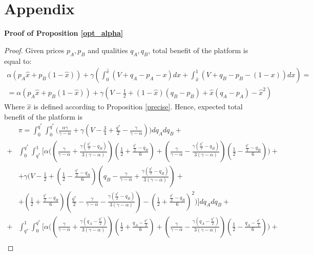 \documentclass[a4paper]{article}
\begin{document}
\section*{Appendix}
	\textbf{Proof of Proposition \ref{opt_alpha}}
	\begin{proof} Given prices $p_A, p_B$ and qualities $q_A, q_B$, total benefit of the platform is equal to:
		\begin{align*}
		\alpha(p_A \hat{x} + p_B(1-\hat{x})) + \gamma \left(\int_{0}^{\hat{x}} (V + q_A - p_A - x)dx + \int_{\hat{x}}^1 (V + q_B - p_B -(1-x))dx\right) = \\
		= 	\alpha(p_A \hat{x} + p_B(1-\hat{x})) + \gamma \left(V - \frac{1}{2}+(1-\hat{x})(q_B - p_B) + \hat{x}(q_A-p_A) - \hat{x}^2  \right)
		\end{align*}
		Where $\hat{x}$ is defined according to Proposition \ref{precise}. Hence, expected total benefit of the platform is
		\begin{align*}
		&\pi = \int_{0}^{q^*} \int_0^{q^*} \biggl( \frac{\alpha \gamma}{\gamma - \alpha} + \gamma \left(V - \frac{3}{4}+ \frac{q^*}{2} - \frac{\gamma}{\gamma - \alpha} \right)\biggr) dq_A dq_B +\\+
		&\int_0^{q^*} \int_{q^*}^1 \biggl[ \alpha \biggl( \left( \frac{\gamma}{\gamma - \alpha} + \frac{\gamma\left( \frac{q^*}{2} - q_B \right) }{3(\gamma - \alpha)} \right)\left(\frac{1}{2} + \frac{\frac{q^*}{2} - q_B}{6} \right) + \left( \frac{\gamma}{\gamma - \alpha} - \frac{\gamma\left( \frac{q^*}{2} - q_B \right) }{3(\gamma - \alpha)} \right)\left(\frac{1}{2} - \frac{\frac{q^*}{2} - q_B}{6} \right) \biggr)+\\
		&+\gamma \biggl(V - \frac{1}{2} + \left(\frac{1}{2} - \frac{\frac{q^*}{2} - q_B}{6} \right) \left( q_B - \frac{\gamma}{\gamma - \alpha} + \frac{\gamma \left( \frac{q^*}{2} - q_B \right)}{3 (\gamma - \alpha)} \right)  + \\
		&+ \left(\frac{1}{2} + \frac{\frac{q^*}{2} - q_B}{6} \right) \left(\frac{q^*}{2} - \frac{\gamma}{\gamma - \alpha} - \frac{\gamma \left( \frac{q^*}{2} - q_B \right)}{3(\gamma - \alpha)} \right)  - \left( \frac{1}{2} + \frac{\frac{q^*}{2} - q_B}{6} \right)^2 \biggr)  \biggr] dq_A dq_B +\\
		+
		&\int_{q^*}^{1} \int_{0}^{q^*} \biggl[ \alpha \biggl( \left( \frac{\gamma}{\gamma - \alpha} + \frac{\gamma\left(q_A - \frac{q^*}{2} \right) }{3(\gamma - \alpha)} \right)\left(\frac{1}{2} + \frac{q_A - \frac{q^*}{2}}{6} \right) + \left( \frac{\gamma}{\gamma - \alpha} - \frac{\gamma\left(q_A- \frac{q^*}{2} \right) }{3(\gamma - \alpha)} \right)\left(\frac{1}{2} - \frac{q_A -\frac{q^*}{2}}{6} \right) \biggr)+\\

\end{align*}
\end{proof}
\end{document}
